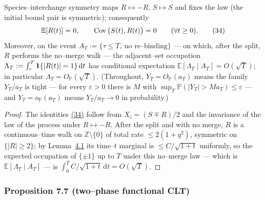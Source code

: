 \documentclass[11pt]{article}
\theoremstyle{plain}
\theoremstyle{definition}
\theoremstyle{remark}
\newcommand{\Z}{\mathbb{Z}}\newcommand{\R}{\mathbb{R}}\newcommand{\N}{\mathbb{N}}
\newcommand{\E}{\mathbb{E}}\newcommand{\PP}{\mathbb{P}}\newcommand{\dd}{\,\mathrm{d}}
\begin{document}
Species--interchange symmetry maps $R\mapsto-R$, $S\mapsto S$ and fixes the law (the
initial bound pair is symmetric); consequently
\label{eq_symm}
\begin{equation}
  \E[R(t)]=0,\qquad \Cov\big(S(t),R(t)\big)=0\qquad(\forall t\ge0).\qquad(34)
\end{equation}
Moreover, on the event $A_T:=\{\tau\le T,\ \text{no re--binding}\}$ --- on which, after
the split, $R$ performs the no--merge walk --- the adjacent--set occupation
$\Lambda_T:=\int_\tau^T\bone\{|R(t)|=1\}\dd t$ has conditional expectation
$\E[\Lambda_T\mid A_T]=O(\sqrt T)$; in particular $\Lambda_T=O_\PP(\sqrt T)$. (Throughout,
$Y_T=O_\PP(a_T)$ means the family $Y_T/a_T$ is tight --- for every $\varepsilon>0$ there is
$M$ with $\sup_T\PP(|Y_T|>M a_T)\le\varepsilon$ --- and $Y_T=o_\PP(a_T)$ means
$Y_T/a_T\to0$ in probability.)
\par
\begin{proof}
The identities \hyperref[eq_symm]{(34)} follow from $X_i=(S\mp R)/2$ and the invariance of the
law of the process under $R\mapsto-R$. After the split and with no merge, $R$ is a
continuous--time walk on $\Z\setminus\{0\}$ of total rate $\le2(1+q^2)$, symmetric on
$\{|R|\ge2\}$; by Lemma~\hyperref[lem_free]{4.1} its time--$t$ marginal is $\le C/\sqrt{1+t}$
uniformly, so the expected occupation of $\{\pm1\}$ up to $T$ under this no--merge law
--- which is $\E[\Lambda_T\mid A_T]$ --- is $\int_0^T C/\sqrt{1+t}\dd t=O(\sqrt T)$.
\end{proof}

\subsubsection{Proposition 7.7 (two--phase functional CLT)}\label{prop_twophase}
\end{document}
